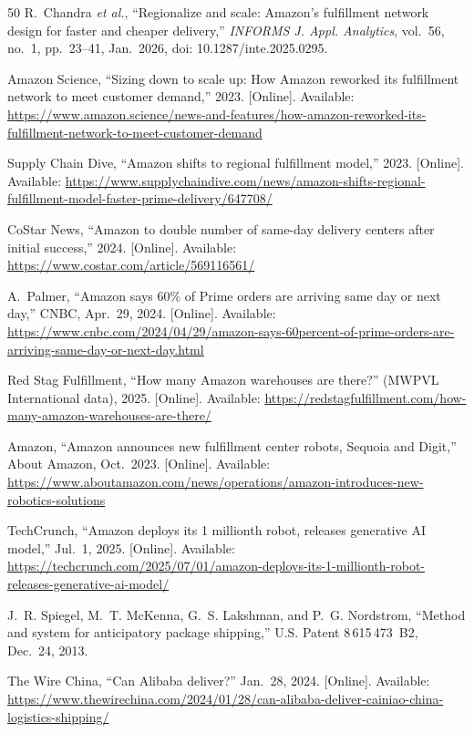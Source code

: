 \documentclass[journal]{IEEEtran}
\begin{document}
\begin{thebibliography}{50}
 R.~Chandra \emph{et al.}, ``Regionalize and scale: Amazon's fulfillment network design for faster and cheaper delivery,'' \emph{INFORMS J. Appl. Analytics}, vol.~56, no.~1, pp.~23--41, Jan.~2026, doi: 10.1287/inte.2025.0295.

 Amazon Science, ``Sizing down to scale up: How Amazon reworked its fulfillment network to meet customer demand,'' 2023. [Online]. Available: \url{https://www.amazon.science/news-and-features/how-amazon-reworked-its-fulfillment-network-to-meet-customer-demand}

 Supply Chain Dive, ``Amazon shifts to regional fulfillment model,'' 2023. [Online]. Available: \url{https://www.supplychaindive.com/news/amazon-shifts-regional-fulfillment-model-faster-prime-delivery/647708/}

 CoStar News, ``Amazon to double number of same-day delivery centers after initial success,'' 2024. [Online]. Available: \url{https://www.costar.com/article/569116561/}

 A.~Palmer, ``Amazon says 60\% of Prime orders are arriving same day or next day,'' CNBC, Apr.~29, 2024. [Online]. Available: \url{https://www.cnbc.com/2024/04/29/amazon-says-60percent-of-prime-orders-are-arriving-same-day-or-next-day.html}

 Red Stag Fulfillment, ``How many Amazon warehouses are there?'' (MWPVL International data), 2025. [Online]. Available: \url{https://redstagfulfillment.com/how-many-amazon-warehouses-are-there/}

 Amazon, ``Amazon announces new fulfillment center robots, Sequoia and Digit,'' About Amazon, Oct.~2023. [Online]. Available: \url{https://www.aboutamazon.com/news/operations/amazon-introduces-new-robotics-solutions}

 TechCrunch, ``Amazon deploys its 1 millionth robot, releases generative AI model,'' Jul.~1, 2025. [Online]. Available: \url{https://techcrunch.com/2025/07/01/amazon-deploys-its-1-millionth-robot-releases-generative-ai-model/}

 J.~R. Spiegel, M.~T. McKenna, G.~S. Lakshman, and P.~G. Nordstrom, ``Method and system for anticipatory package shipping,'' U.S. Patent 8\,615\,473~B2, Dec.~24, 2013.

 The Wire China, ``Can Alibaba deliver?'' Jan.~28, 2024. [Online]. Available: \url{https://www.thewirechina.com/2024/01/28/can-alibaba-deliver-cainiao-china-logistics-shipping/}


\end{thebibliography}
\end{document}
